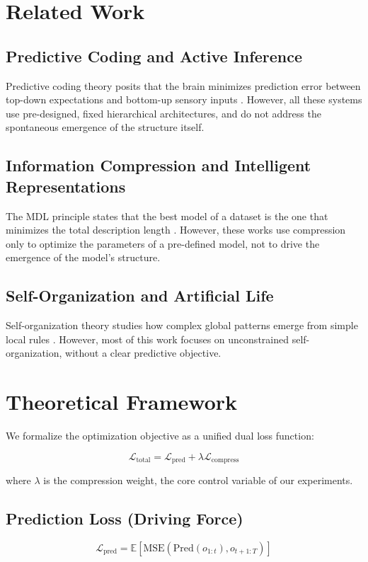 \documentclass[11pt]{article}
\begin{document}
\section{Related Work}

\subsection{Predictive Coding and Active Inference}
Predictive coding theory posits that the brain minimizes prediction error between top-down expectations and bottom-up sensory inputs \cite{rao1999predictive}. However, all these systems use pre-designed, fixed hierarchical architectures, and do not address the spontaneous emergence of the structure itself.

\subsection{Information Compression and Intelligent Representations}
The MDL principle states that the best model of a dataset is the one that minimizes the total description length \cite{rissanen1978modeling}. However, these works use compression only to optimize the parameters of a pre-defined model, not to drive the emergence of the model's structure.

\subsection{Self-Organization and Artificial Life}
Self-organization theory studies how complex global patterns emerge from simple local rules \cite{holland1995hidden}. However, most of this work focuses on unconstrained self-organization, without a clear predictive objective.

\section{Theoretical Framework}

We formalize the optimization objective as a unified dual loss function:

\begin{equation}
\mathcal{L}_{\text{total}} = \mathcal{L}_{\text{pred}} + \lambda \mathcal{L}_{\text{compress}}
\end{equation}

where $\lambda$ is the compression weight, the core control variable of our experiments.

\subsection{Prediction Loss (Driving Force)}
\begin{equation}
\mathcal{L}_{\text{pred}} = \mathbb{E}\left[ \text{MSE}\left(\text{Pred}(o_{1:t}), o_{t+1:T}\right) \right]
\end{equation}
\end{document}
